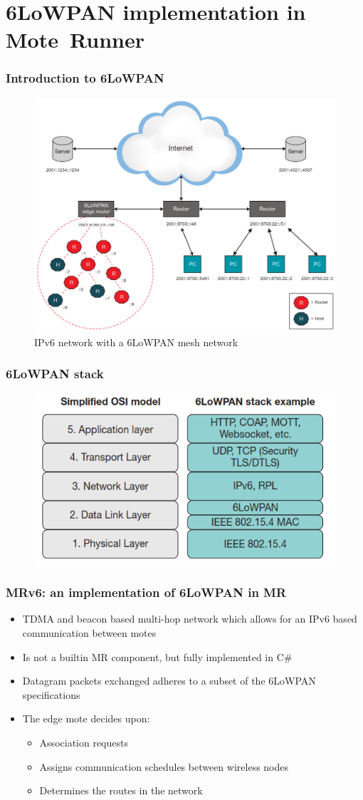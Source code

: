 \section{6LoWPAN implementation in \mbox{Mote Runner}}
\begin{frame}[fragile]
  \frametitle{Introduction to 6LoWPAN}
  \begin{figure}
    \includegraphics[width=.7\textwidth]{img/6low_network.png}
    \caption{IPv6 network with a 6LoWPAN mesh network}
  \end{figure}
\end{frame}

\begin{frame}[fragile]
  \frametitle{6LoWPAN stack}
  \begin{figure}
    \includegraphics[width=.6\textwidth]{img/6low_stack.png}
  \end{figure}
\end{frame}

\begin{frame}[fragile]
  \frametitle{MRv6: an implementation of 6LoWPAN in MR}
  \begin{itemize}
    \item TDMA and beacon based multi-hop network which allows for an IPv6 based communication between motes
    \item Is not a builtin MR component, but fully implemented in C\#
    \item Datagram packets exchanged adheres to a subset of the 6LoWPAN specifications
    \item The edge mote decides upon:
    \begin{itemize}
      \item Association requests
      \item Assigns communication schedules between wireless nodes
      \item Determines the routes in the network
    \end{itemize}
  \end{itemize}
\end{frame}


